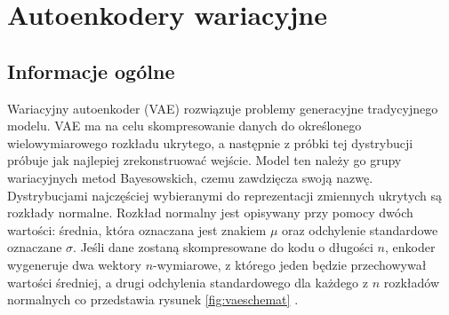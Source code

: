 \documentclass[a4paper,12pt,oneside]{book} %
\begin{document}
\chapter{Autoenkodery wariacyjne}
\section{Informacje ogólne}
Wariacyjny autoenkoder (VAE) rozwiązuje problemy generacyjne tradycyjnego modelu. VAE ma na celu skompresowanie danych do określonego wielowymiarowego rozkładu ukrytego, a następnie z próbki tej dystrybucji próbuje jak najlepiej zrekonstruować wejście. Model ten należy go grupy wariacyjnych metod Bayesowskich, czemu zawdzięcza swoją nazwę. Dystrybucjami najczęściej wybieranymi do reprezentacji zmiennych ukrytych są rozkłady normalne. Rozkład normalny jest opisywany przy pomocy dwóch wartości: średnia, która oznaczana jest znakiem $\mu$ oraz odchylenie standardowe oznaczane $\sigma$. Jeśli dane zostaną skompresowane do kodu o długości $n$, enkoder wygeneruje dwa wektory $n$-wymiarowe, z którego jeden będzie przechowywał wartości średniej, a drugi odchylenia standardowego dla każdego z $n$ rozkładów normalnych co przedstawia rysunek \ref{fig:vaeschemat} \cite{vaetootorial}.
\end{document}
